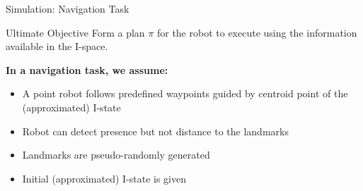 \begin{frame}{Simulation: Navigation Task}
    \begin{block}{Ultimate Objective} 
       Form a plan $\pi$ for the robot to execute using the information available in
       the I-space.
    \end{block}

    \textbf{In a navigation task, we assume:}
    \begin{itemize}
    \item A point robot follows predefined waypoints guided by centroid point of the
      (approximated) I-state
    \item Robot can detect presence but not distance to the landmarks
    \item Landmarks are pseudo-randomly generated
    \item Initial (approximated) I-state is given
    \end{itemize}
\end{frame}